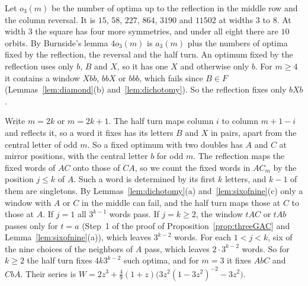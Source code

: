 \begin{remark}\label{rem:threeorbits}
Let $o_3(m)$ be the number of optima up to the reflection in the middle row and the column
reversal. It is $15$, $58$, $227$, $864$, $3190$ and $11502$ at
widths $3$ to $8$. At width $3$ the square has four more symmetries, and under all eight
there are $10$ orbits. By Burnside's lemma $4o_3(m)$ is $a_3(m)$ plus the numbers of optima
fixed by the reflection, the reversal and the half turn. An optimum fixed by the reflection
uses only $b$, $B$ and $X$, so it has one $X$ and otherwise only $b$. For $m\ge4$ it
contains a window $Xbb$, $bbX$ or $bbb$, which fails since $B\in F$
(Lemmas~\ref{lem:diamond}(b) and~\ref{lem:dichotomy}). So the reflection fixes only $bXb$.

Write $m=2k$ or $m=2k+1$. The half turn maps column $i$ to column $m+1-i$ and reflects it,
so a word it fixes has its letters $B$ and $X$ in pairs, apart from the central letter of
odd $m$. So a fixed optimum with two doubles has $A$ and $C$ at mirror positions, with the
central letter $b$ for odd $m$. The reflection maps the fixed words of $AC$ onto those of
$CA$, so we count the fixed words in $AC_m$ by the position $j\le k$ of $A$. Such a word is
determined by its first $k$ letters, and $k-1$ of them are singletons. By
Lemmas~\ref{lem:dichotomy}(a) and~\ref{lem:sixofnine}(c) only a window with $A$ or $C$ in
the middle can fail, and the half turn maps those at $C$ to those at $A$. If $j=1$ all
$3^{k-1}$ words pass. If $j=k\ge2$, the window $tAC$ or $tAb$ passes only for $t=a$ (Step~1
of the proof of Proposition~\ref{prop:threeGAC} and Lemma~\ref{lem:sixofnine}(a)), which
leaves $3^{k-2}$ words. For each $1<j<k$, six of the nine choices of the neighbors of $A$
pass, which leaves $2\cdot3^{k-2}$ words. So for $k\ge2$ the half turn fixes $4k3^{k-2}$
such optima, and for $m=3$ it fixes $AbC$ and $CbA$. Their series is
$W=2z^3+\frac49(1+z)\bigl(3z^2(1-3z^2)^{-2}-3z^2\bigr)$.


\end{remark}
